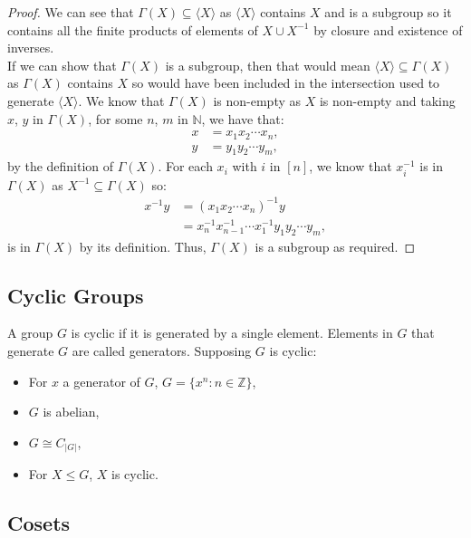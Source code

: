 \begin{proof}
    We can see that $\Gamma(X) \subseteq \langle X \rangle$ as $\langle X \rangle$
    contains $X$ and is a subgroup so it contains all the finite products
    of elements of $X \cup X^{-1}$ by closure and existence of inverses.
    \\[\baselineskip]
    If we can show that $\Gamma(X)$ is a subgroup, then that would mean
    $\langle X \rangle \subseteq \Gamma(X)$ as $\Gamma(X)$ contains $X$
    so would have been included in the intersection used to generate 
    $\langle X \rangle$. We know that $\Gamma(X)$ is non-empty as $X$ is
    non-empty and taking $x$, $y$ in $\Gamma(X)$, for some $n$, $m$ in $\mathbb{N}$,
    we have that: \begin{align*}
        x &= x_1 x_2 \cdots x_n, \\
        y &= y_1 y_2 \cdots y_m, 
    \end{align*} by the definition of $\Gamma(X)$. For each $x_i$ with
    $i$ in $[n]$, we know that $x_i^{-1}$ is in $\Gamma(X)$ as 
    $X^{-1} \subseteq \Gamma(X)$ so: \begin{align*}
        x^{-1}y &= (x_1 x_2 \cdots x_n)^{-1}y \\
        &= x_n^{-1}x_{n - 1}^{-1} \cdots x_1^{-1} y_1 y_2 \cdots y_m,
    \end{align*} is in $\Gamma(X)$ by its definition. Thus, $\Gamma(X)$
    is a subgroup as required.
\end{proof}

\subsection{Cyclic Groups}

A group $G$ is cyclic if it is generated by a single element. Elements in
$G$ that generate $G$ are called generators. Supposing $G$ is cyclic: \begin{itemize}
    \item For $x$ a generator of $G$, $G = \{x^n : n \in \mathbb{Z}\}$,
    \item $G$ is abelian,
    \item $G \cong C_{|G|}$,
    \item For $X \leq G$, $X$ is cyclic.
\end{itemize}

\subsection{Cosets}

